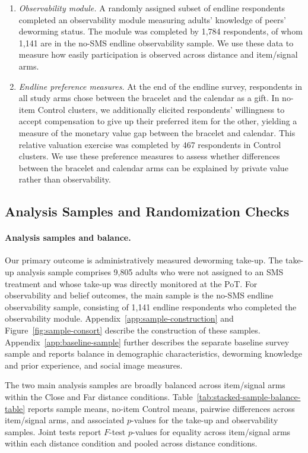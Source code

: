 \documentclass[ECM\space ReStud.tex]{subfiles}
\begin{document}
\begin{enumerate}
\item[] \emph{Observability module.}
A randomly assigned subset of endline respondents completed an observability module measuring adults' knowledge of peers' deworming status. The module was completed by 1{,}784 respondents, of whom 1{,}141 are in the no-SMS endline observability sample. We use these data to measure how easily participation is observed across distance and item/signal arms.

\item[] \emph{Endline preference measures.}
At the end of the endline survey, respondents in all study arms chose between the bracelet and the calendar as a gift. In no-item Control clusters, we additionally elicited respondents' willingness to accept compensation to give up their preferred item for the other, yielding a measure of the monetary value gap between the bracelet and calendar. This relative valuation exercise was completed by 467 respondents in Control clusters. We use these preference measures to assess whether differences between the bracelet and calendar arms can be explained by private value rather than observability.
\end{enumerate}

\subsection{Analysis Samples and Randomization Checks}
\label{sec:sample-balance}

\paragraph{Analysis samples and balance.}
Our primary outcome is administratively measured deworming take-up. The take-up analysis sample comprises 9{,}805 adults who were not assigned to an SMS treatment and whose take-up was directly monitored at the PoT. For observability and belief outcomes, the main sample is the no-SMS endline observability sample, consisting of 1{,}141 endline respondents who completed the observability module. Appendix~\ref{app:sample-construction} and Figure~\ref{fig:sample-consort} describe the construction of these samples. Appendix~\ref{app:baseline-sample} further describes the separate baseline survey sample and reports balance in demographic characteristics, deworming knowledge and prior experience, and social image measures.


The two main analysis samples are broadly balanced across item/signal arms within the Close and Far distance conditions. Table~\ref{tab:stacked-sample-balance-table} reports sample means, no-item Control means, pairwise differences across item/signal arms, and associated \(p\)-values for the take-up and observability samples. Joint tests report \(F\)-test \(p\)-values for equality across item/signal arms within each distance condition and pooled across distance conditions.
\end{document}
